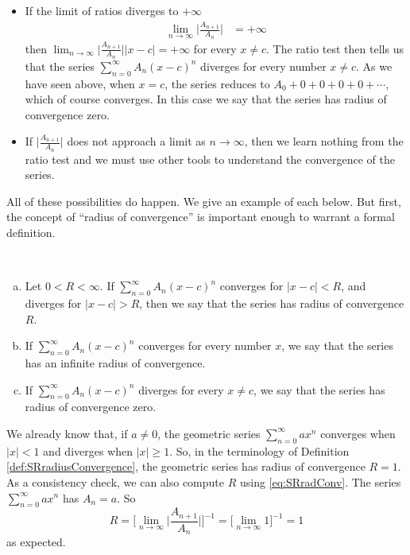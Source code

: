 \begin{itemize}
\item If the limit of ratios diverges to $+\infty$
\begin{align*}
\lim_{n\rightarrow\infty}\Big|\frac{A_{n+1}}{A_n}\Big| &= +\infty
\end{align*}
then $\lim_{n\rightarrow\infty}\Big|\frac{A_{n+1}}{A_n}\Big||x-c|
=+\infty$ for every $x\ne c$. The ratio test then tells us that the series
$\sum_{n=0}^\infty A_n(x-c)^n$ diverges for every number $x\ne c$. As
we have seen above, when $x=c$, the series reduces to
$A_0+0+0+0+0+\cdots$, which of course converges.
In this case we say that the series has radius of convergence zero.

\item If $\Big|\frac{A_{n+1}}{A_n}\Big|$ does not approach a limit
as $n\rightarrow\infty$, then we learn nothing from the
ratio test and we must use other tools to understand the convergence of the series.
\end{itemize}
All of these possibilities do happen. We give an example of each
below. But first, the concept of ``radius of convergence'' is
important enough to warrant a formal definition.

\begin{defn}\label{def:SRradiusConvergence}
\
\begin{enumerate}[(a)]
\item
Let $0<R<\infty$. If $\sum_{n=0}^\infty A_n(x-c)^n$
converges for $|x-c|<R$,  and diverges for $|x-c| > R$,
then we say that the series has radius of convergence $R$.

\item
If $\sum_{n=0}^\infty A_n(x-c)^n$ converges for every number $x$,
we say that the series has an infinite radius of convergence.

\item
If $\sum_{n=0}^\infty A_n(x-c)^n$ diverges for every $x\ne c$,
we say that the series has radius of convergence zero.

\end{enumerate}
\end{defn}


\begin{eg}\label{eg:PWRa}
We already know that, if $a\ne 0$, the geometric series $\sum\limits_{n=0}^\infty a x^n$ converges
when $|x|<1$ and diverges when $|x|\ge 1$. So, in the terminology
of Definition \ref{def:SRradiusConvergence}, the geometric series
has radius of convergence $R=1$. As a consistency check, we can
also compute $R$ using \eqref{eq:SRradConv}. The series
$\sum\limits_{n=0}^\infty a x^n$ has $A_n=a$.
So
\begin{equation*}
R=\bigg[\lim_{n\rightarrow\infty}\Big|\frac{A_{n+1}}{A_n}\Big|\bigg]^{-1}
=\Big[\lim_{n\rightarrow\infty}1\Big]^{-1}
=1
\end{equation*}
as expected.
\end{eg}


